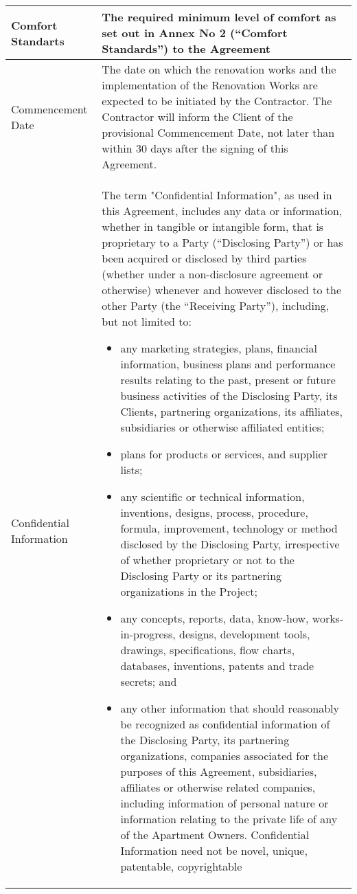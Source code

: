 \begin{center}
\begin{longtabu}{|X|X[3]|}
	Comfort Standarts & The required minimum level of comfort as set out in Annex No 2 (“Comfort Standards”) to the Agreement \\ \hline{}
	Commencement Date & The date on which the renovation works and the
			    implementation of the Renovation Works are expected to be initiated by the
			    Contractor. The Contractor will inform the Client of the provisional
			    Commencement Date, not later than within 30 days after the signing of this
			    Agreement. \\ \hline{}
	Confidential Information & The term "Confidential Information", as used
				   in this Agreement, includes any data or information, whether in tangible or
				   intangible form, that is proprietary to a Party (“Disclosing Party”) or has
				   been acquired or disclosed by third parties (whether under a non{-}disclosure
				   agreement or otherwise) whenever and however disclosed to the other Party (the
				   “Receiving Party”), including, but not limited to:
				   \begin{itemize}
					\item	any marketing strategies,
						plans, financial information, business plans and performance results relating
						to the past, present or future business activities of the Disclosing Party, its
						Clients, partnering organizations, its affiliates, subsidiaries or otherwise
						affiliated entities;
					\item	plans for products or services, and supplier lists;
					\item	any scientific or technical
						information, inventions, designs, process, procedure, formula, improvement,
						technology or method disclosed by the Disclosing Party, irrespective of whether
						proprietary or not to the Disclosing Party or its partnering organizations in
						the Project;
					\item	any concepts, reports, data,
						know{-}how, works-in-progress, designs, development tools, drawings,
						specifications, flow charts, databases, inventions, patents and trade secrets;
						and
					\item	any other information that
						should reasonably be recognized as confidential information of the Disclosing
						Party, its partnering organizations, companies associated for the purposes of
						this Agreement, subsidiaries, affiliates or otherwise related companies,
						including information of personal nature or information relating to the private
						life of any of the Apartment Owners.
						Confidential Information need not be novel, unique, patentable, copyrightable

\end{itemize}
\end{longtabu}
\end{center}
